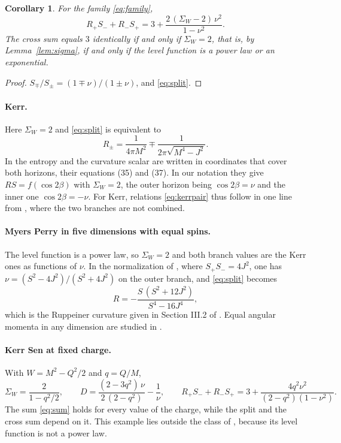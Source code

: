 \documentclass[11pt]{article}
\newtheorem{corollary}{Corollary}
\theoremstyle{definition}
\theoremstyle{remark}
\newcommand{\SW}{\Sigma_{W}}
\begin{document}
\begin{corollary}\label{cor:cross}
For the family \eqref{eq:family},
\begin{equation}\label{eq:cross}
R_{+}S_{-}+R_{-}S_{+}=3+\frac{2\,(\SW-2)\,\nu^{2}}{1-\nu^{2}} .
\end{equation}
The cross sum equals $3$ identically if and only if $\SW=2$, that is, by Lemma~\ref{lem:sigma}, if and only if the level function is a power law or an exponential.
\end{corollary}

\begin{proof}
$S_{\mp}/S_{\pm}=(1\mp\nu)/(1\pm\nu)$, and \eqref{eq:split}.
\end{proof}

\paragraph{Kerr.} Here $\SW=2$ and \eqref{eq:split} is equivalent to
\begin{equation}\label{eq:kerr}
R_{\pm}=\frac{1}{4\pi M^{2}}\mp\frac{1}{2\pi\sqrt{M^{4}-J^{2}}} .
\end{equation}
In \cite{ABP15} the entropy and the curvature scalar are written in coordinates that cover both horizons, their equations (35) and (37). In our notation they give $RS=f(\cos2\beta)$ with $\SW=2$, the outer horizon being $\cos2\beta=\nu$ and the inner one $\cos2\beta=-\nu$. For Kerr, relations \eqref{eq:kerrpair} thus follow in one line from \cite{ABP15}, where the two branches are not combined.

\paragraph{Myers Perry in five dimensions with equal spins.} The level function is a power law, so $\SW=2$ and both branch values are the Kerr ones as functions of $\nu$. In the normalization of \cite{BMMA}, where $S_{+}S_{-}=4J^{2}$, one has $\nu=(S^{2}-4J^{2})/(S^{2}+4J^{2})$ on the outer branch, and \eqref{eq:split} becomes
\[
R=-\frac{S\,(S^{2}+12J^{2})}{S^{4}-16J^{4}} ,
\]
which is the Ruppeiner curvature given in Section III.2 of \cite{BMMA}. Equal angular momenta in any dimension are studied in \cite{AP13}.

\paragraph{Kerr Sen at fixed charge.} With $W=M^{2}-Q^{2}/2$ and $q=Q/M$,
\begin{equation}\label{eq:kerrsen}
\SW=\frac{2}{1-q^{2}/2},\qquad
D=\frac{(2-3q^{2})\,\nu}{2\,(2-q^{2})}-\frac1\nu,\qquad
R_{+}S_{-}+R_{-}S_{+}=3+\frac{4q^{2}\nu^{2}}{(2-q^{2})(1-\nu^{2})} .
\end{equation}
The sum \eqref{eq:sum} holds for every value of the charge, while the split and the cross sum depend on it. This example lies outside the class of \cite{ABP06}, because its level function is not a power law.
\end{document}
